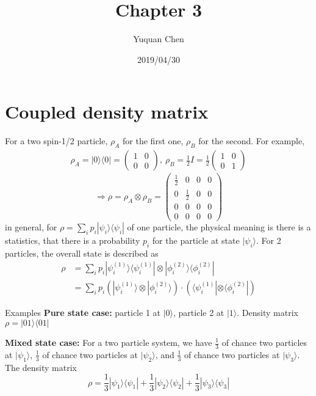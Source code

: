 \documentclass[UTF8,12pt]{article} %
\begin{document}
\title{Chapter 3}
\author{Yuquan Chen}
\date{2019/04/30} %
\maketitle

\section{Coupled density matrix}

For a two spin-1/2 particle, $\rho_{A}$ for the first one, $\rho_{B}$ for the second. For example, 
\begin{align*}
\rho_{A} = |0\rangle\langle 0| = \begin{pmatrix}1&0\\0&0\end{pmatrix},~ \rho_{B} = \frac{1}{2} I = \frac{1}{2}\begin{pmatrix}1&0\\0&1\end{pmatrix}
\end{align*}
$$\Rightarrow \rho = \rho_{A} \otimes \rho_{B} = \begin{pmatrix}\frac{1}{2}&0&0&0\\0&\frac{1}{2}&0&0\\0&0&0&0\\0&0&0&0\end{pmatrix}$$
in general, for $\rho = \sum_{i}p_{i}|\psi_{i}\rangle\langle \psi_{i}|$ of one particle, the physical meaning is there is a statistics, that there is a probability $p_{i}$ for the particle at state $|\psi_{i}\rangle$. For 2 particles, the overall state is described as
\begin{align}
\rho &= \sum_{i}p_{i}|\psi_{i}^{(1)}\rangle\langle\psi_{i}^{(1)}| \otimes |\phi_{i}^{(2)}\rangle\langle\phi_{i}^{(2)}| \\
&= \sum_{i} p_{i}\left(|\psi_{i}^{(1)}\rangle \otimes |\phi_{i}^{(2)}\rangle\right) \cdot \left(\langle\psi_{i}^{(1)}|\otimes\langle\phi_{i}^{(2)}|\right)
\end{align}

\begin{myboxes}{Examples}{}
\textbf{Pure state case:} particle 1 at $|0\rangle$, particle 2 at $|1\rangle$. Density matrix $\rho = |01\rangle\langle 01|$

\textbf{Mixed state case:} For a two particle system, we have $\frac{1}{3}$ of chance two particles at $|\psi_{1}\rangle$, $\frac{1}{3}$ of chance two particles at $|\psi_{2}\rangle$, and $\frac{1}{3}$ of chance two particles at $|\psi_{3}\rangle$. The density matrix
$$\rho = \frac{1}{3}|\psi_{1}\rangle\langle\psi_{1}| + \frac{1}{3}|\psi_{2}\rangle\langle\psi_{2}| + \frac{1}{3}|\psi_{3}\rangle\langle\psi_{3}|$$
\end{myboxes}
\end{document}
